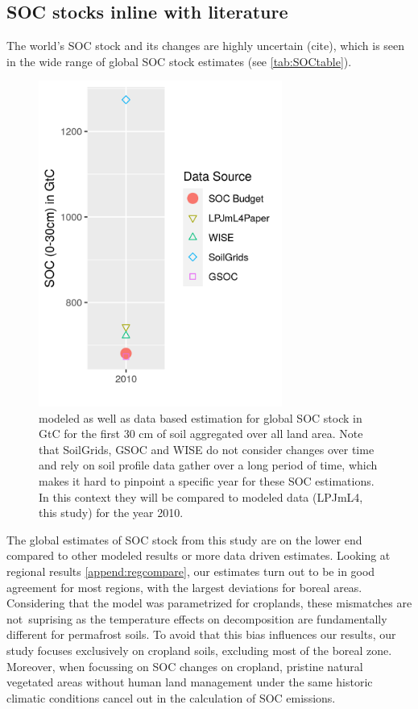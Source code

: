 \documentclass[gc, manuscript]{copernicus}
\begin{document}
\hypertarget{soc-stocks-inline-with-literature}{%
\subsection{SOC stocks inline with literature}\label{soc-stocks-inline-with-literature}}

The world's SOC stock and its changes are highly uncertain (cite), which is seen in the wide range of global SOC stock estimates (see \ref{tab:SOCtable}).

\begin{figure}[H]
\includegraphics[width=8cm]{../ResultNotebooks/Output/Images/glo_comparisonfigure} \caption{modeled as well as data based estimation for global SOC stock in GtC for the first 30 cm of soil aggregated over all land area. Note that SoilGrids, GSOC and WISE do not consider changes over time and rely on soil profile data gather over a long period of time, which makes it hard to pinpoint a specific year for these SOC estimations. In this context they will be compared to modeled data (LPJmL4, this study) for the year 2010.}\label{fig:SOCtable}
\end{figure}

The global estimates of SOC stock from this study are on the lower end compared to other modeled results or more data driven estimates. Looking at regional results \ref{append:regcompare}, our estimates turn out to be in good agreement for most regions, with the largest deviations for boreal areas. Considering that the model was parametrized for croplands, these mismatches are not~suprising as the temperature effects on decomposition are fundamentally different for permafrost soils. To avoid that this bias influences our results, our study focuses exclusively on cropland soils, excluding most of the boreal zone. Moreover, when focussing on SOC changes on cropland, pristine natural vegetated areas without human land management under the same historic climatic conditions cancel out in the calculation of SOC emissions.
\end{document}
